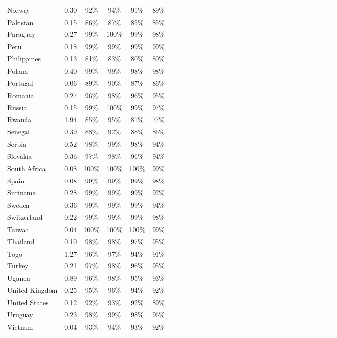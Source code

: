 \begin{ThreePartTable}
\begin{longtable}[t]{l|ccccl|ccccl|ccccl|ccccl|ccccl|cccc}
Norway & 0.30 & 92\% & 94\% & 91\% & 89\%\\
Pakistan & 0.15 & 86\% & 87\% & 85\% & 85\%\\
Paraguay & 0.27 & 99\% & 100\% & 99\% & 98\%\\
Peru & 0.18 & 99\% & 99\% & 99\% & 99\%\\
Philippines & 0.13 & 81\% & 83\% & 80\% & 80\%\\
Poland & 0.40 & 99\% & 99\% & 98\% & 98\%\\
Portugal & 0.06 & 89\% & 90\% & 87\% & 86\%\\
Romania & 0.27 & 96\% & 98\% & 96\% & 95\%\\
Russia & 0.15 & 99\% & 100\% & 99\% & 97\%\\
Rwanda & 1.94 & 85\% & 95\% & 81\% & 77\%\\
Senegal & 0.39 & 88\% & 92\% & 88\% & 86\%\\
Serbia & 0.52 & 98\% & 99\% & 98\% & 94\%\\
Slovakia & 0.36 & 97\% & 98\% & 96\% & 94\%\\
South Africa & 0.08 & 100\% & 100\% & 100\% & 99\%\\
Spain & 0.08 & 99\% & 99\% & 99\% & 98\%\\
Suriname & 0.28 & 99\% & 99\% & 99\% & 92\%\\
Sweden & 0.36 & 99\% & 99\% & 99\% & 94\%\\
Switzerland & 0.22 & 99\% & 99\% & 99\% & 98\%\\
Taiwan & 0.04 & 100\% & 100\% & 100\% & 99\%\\
Thailand & 0.10 & 98\% & 98\% & 97\% & 95\%\\
Togo & 1.27 & 96\% & 97\% & 94\% & 91\%\\
Turkey & 0.21 & 97\% & 98\% & 96\% & 95\%\\
Uganda & 0.89 & 96\% & 98\% & 95\% & 93\%\\
United Kingdom & 0.25 & 95\% & 96\% & 94\% & 92\%\\
United States & 0.12 & 92\% & 93\% & 92\% & 89\%\\
Uruguay & 0.23 & 98\% & 99\% & 98\% & 96\%\\
Vietnam & 0.04 & 93\% & 94\% & 93\% & 92\%\\*
\end{longtable}
\end{ThreePartTable}
\endgroup{}
